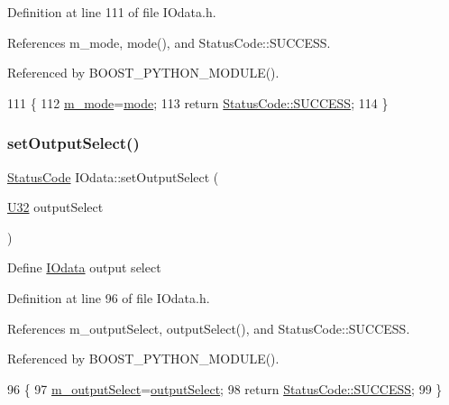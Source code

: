 Definition at line 111 of file I\+Odata.\+h.



References m\+\_\+mode, mode(), and Status\+Code\+::\+S\+U\+C\+C\+E\+SS.



Referenced by B\+O\+O\+S\+T\+\_\+\+P\+Y\+T\+H\+O\+N\+\_\+\+M\+O\+D\+U\+L\+E().


\begin{DoxyCode}
111                                      \{
112     \hyperlink{classIOdata_a0782e31763fa855f1ecbd377dce538e6}{m\_mode}=\hyperlink{classIOdata_aae2073c3bc6bc9f620dc0fca7fccc9a7}{mode};
113     \textcolor{keywordflow}{return} \hyperlink{classStatusCode_a6f565cbeadc76d14c72f047e5e85eb4badd0da38d3ba0d922efd1f4619bc37ad8}{StatusCode::SUCCESS};
114   \}
\end{DoxyCode}
\mbox{\label{classIOdata_a09675d3efa14ba00cc22f8ff8d463389}} 
\subsubsection{\texorpdfstring{set\+Output\+Select()}{setOutputSelect()}}
{\footnotesize\ttfamily \hyperlink{classStatusCode}{Status\+Code} I\+Odata\+::set\+Output\+Select (\begin{DoxyParamCaption}\item[{\hyperlink{classIOdata_a96fb57f5fcd87b708743abd3c86a5198}{U32}}]{output\+Select }\end{DoxyParamCaption})\hspace{0.3cm}{\ttfamily [inline]}}

Define \hyperlink{classIOdata}{I\+Odata} output select 

Definition at line 96 of file I\+Odata.\+h.



References m\+\_\+output\+Select, output\+Select(), and Status\+Code\+::\+S\+U\+C\+C\+E\+SS.



Referenced by B\+O\+O\+S\+T\+\_\+\+P\+Y\+T\+H\+O\+N\+\_\+\+M\+O\+D\+U\+L\+E().


\begin{DoxyCode}
96                                               \{
97     \hyperlink{classIOdata_acc46d71243b542e68277e242effa7f1b}{m\_outputSelect}=\hyperlink{classIOdata_aaa410b57a4607857d45ac6a7cd013307}{outputSelect};
98     \textcolor{keywordflow}{return} \hyperlink{classStatusCode_a6f565cbeadc76d14c72f047e5e85eb4badd0da38d3ba0d922efd1f4619bc37ad8}{StatusCode::SUCCESS};
99   \}
\end{DoxyCode}
\mbox{\label{classIOdata_aeca09aa9a8c2ccc4c3a728b2ddcf4b2a}} 
